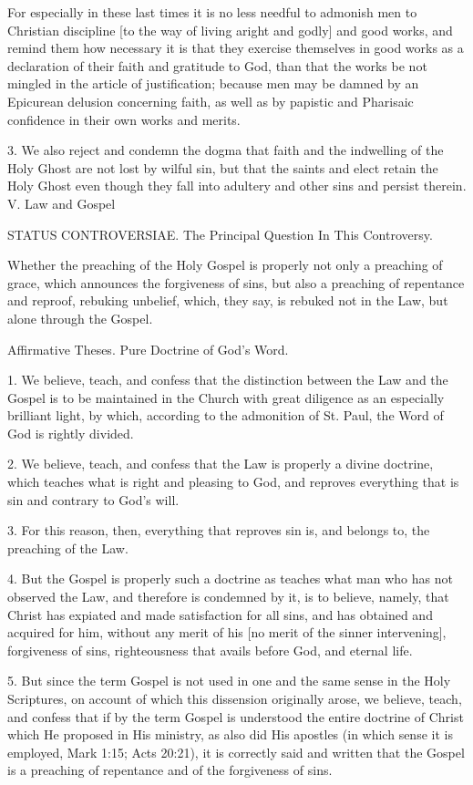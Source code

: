 For especially in these last times it is no less needful to admonish men to Christian discipline [to the way of living aright and godly] and good works, and remind them how necessary it is that they exercise themselves in good works as a declaration of their faith and gratitude to God, than that the works be not mingled in the article of justification; because men may be damned by an Epicurean delusion concerning faith, as well as by papistic and Pharisaic confidence in their own works and merits.

3. We also reject and condemn the dogma that faith and the indwelling of the Holy Ghost are not lost by wilful sin, but that the saints and elect retain the Holy Ghost even though they fall into adultery and other sins and persist therein.
V. Law and Gospel

STATUS CONTROVERSIAE.
The Principal Question In This Controversy.

Whether the preaching of the Holy Gospel is properly not only a preaching of grace, which announces the forgiveness of sins, but also a preaching of repentance and reproof, rebuking unbelief, which, they say, is rebuked not in the Law, but alone through the Gospel.

Affirmative Theses.
Pure Doctrine of God's Word.

1. We believe, teach, and confess that the distinction between the Law and the Gospel is to be maintained in the Church with great diligence as an especially brilliant light, by which, according to the admonition of St. Paul, the Word of God is rightly divided.

2. We believe, teach, and confess that the Law is properly a divine doctrine, which teaches what is right and pleasing to God, and reproves everything that is sin and contrary to God's will.

3. For this reason, then, everything that reproves sin is, and belongs to, the preaching of the Law.

4. But the Gospel is properly such a doctrine as teaches what man who has not observed the Law, and therefore is condemned by it, is to believe, namely, that Christ has expiated and made satisfaction for all sins, and has obtained and acquired for him, without any merit of his [no merit of the sinner intervening], forgiveness of sins, righteousness that avails before God, and eternal life.

5. But since the term Gospel is not used in one and the same sense in the Holy Scriptures, on account of which this dissension originally arose, we believe, teach, and confess that if by the term Gospel is understood the entire doctrine of Christ which He proposed in His ministry, as also did His apostles (in which sense it is employed, Mark 1:15; Acts 20:21), it is correctly said and written that the Gospel is a preaching of repentance and of the forgiveness of sins.

